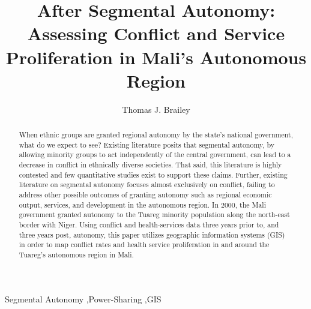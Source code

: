 \documentclass[12pt]{elsarticle}
\begin{document}
\begin{frontmatter}


\title{After Segmental Autonomy: Assessing Conflict and Service Proliferation in Mali's Autonomous Region}




\author{Thomas J. Brailey}

\address{University of California, San Diego}

\begin{abstract}
When ethnic groups are granted regional autonomy by the state’s national government, what do we expect to see? Existing literature posits that segmental autonomy, by allowing minority groups to act independently of the central government, can lead to a decrease in conflict in ethnically diverse societies. That said, this literature is highly contested and few quantitative studies exist to support these claims. Further, existing literature on segmental autonomy focuses almost exclusively on conflict, failing to address other possible outcomes of granting autonomy such as regional economic output, services, and development in the autonomous region. In 2000, the Mali government granted autonomy to the Tuareg minority population along the north-east border with Niger. Using conflict and health-services data three years prior to, and three years post, autonomy, this paper utilizes geographic information systems (GIS) in order to map conflict rates and health service proliferation in and around the Tuareg's autonomous region in Mali. 
\end{abstract}

\begin{keyword}
Segmental Autonomy \sep Power-Sharing \sep GIS


\end{keyword}

\end{frontmatter}
\end{document}
